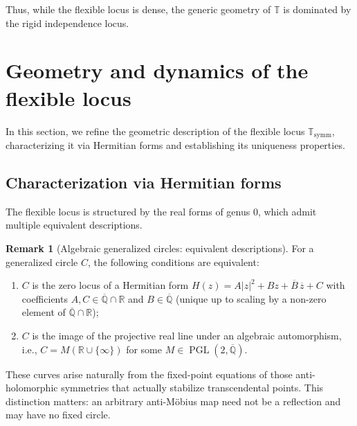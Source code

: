 \documentclass[11pt,a4paper]{article}
\theoremstyle{plain}
\theoremstyle{definition}
\newtheorem{remark}[theorem]{Remark}
\newcommand{\R}{\mathbb{R}}
\newcommand{\Alg}{\overline{\mathbb{Q}}}
\newcommand{\trans}{\mathbb{T}}
\newcommand{\Tc}{\trans}
\DeclareMathOperator{\PGL}{PGL}
\newcommand{\ssymm}{\Tc_{\mathrm{symm}}}
\begin{document}
Thus, while the flexible locus is dense, the generic geometry of $\Tc$ is dominated by the rigid independence locus.

\section{Geometry and dynamics of the flexible locus}\label{sec:geometric-interpretations}

In this section, we refine the geometric description of the flexible locus $\ssymm$, characterizing it via Hermitian forms and establishing its uniqueness properties.

\subsection{Characterization via Hermitian forms}

The flexible locus is structured by the real forms of genus 0, which admit multiple equivalent descriptions.

\begin{remark}[Algebraic generalized circles: equivalent descriptions]\label{rem:equiv-alg-circle}
	For a generalized circle $C$, the following conditions are equivalent:
	\begin{enumerate}[itemsep=0.2ex,topsep=0.3ex,leftmargin=1.75em]
		\item $C$ is the zero locus of a Hermitian form $H(z)=A|z|^2+Bz+\overline{B}\,\overline{z}+C$ with coefficients $A,C\in\Alg\cap\R$ and $B\in\Alg$ (unique up to scaling by a non-zero element of $\Alg\cap\R$);
		\item $C$ is the image of the projective real line under an algebraic automorphism, i.e., $C=M(\R\cup\{\infty\})$ for some $M\in\PGL(2,\Alg)$.
	\end{enumerate}
	\end{remark}

These curves arise naturally from the fixed-point equations of those anti-holomorphic symmetries that actually stabilize transcendental points. This distinction matters: an arbitrary anti-Möbius map need not be a reflection and may have no fixed circle.
\end{document}
